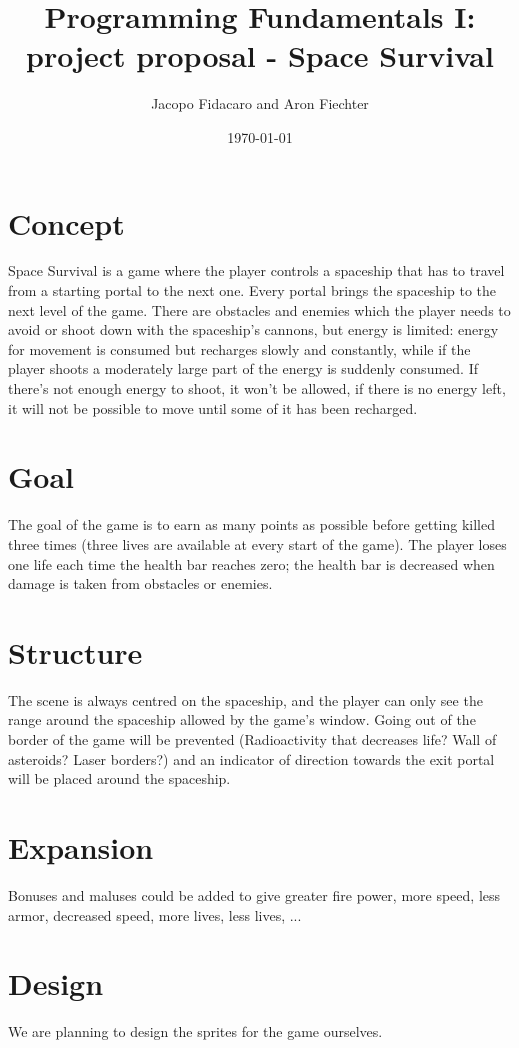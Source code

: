 \documentclass[12pt]{article}
\title{Programming Fundamentals I: project proposal - Space Survival}
\author{Jacopo Fidacaro and Aron Fiechter}
\date{\today}
\begin{document}
\maketitle
\section*{Concept}
Space Survival is a game where the player controls a spaceship that has to travel from a starting portal to the next one. Every portal brings the spaceship to the next level of the game. There are obstacles and enemies which the player needs to avoid or shoot down with the spaceship's cannons, but energy is limited: energy for movement is consumed but recharges slowly and constantly, while if the player shoots a moderately large part of the energy is suddenly consumed. If there's not enough energy to shoot, it won't be allowed, if there is no energy left, it will not be possible to move until some of it has been recharged.
\section*{Goal}
The goal of the game is to earn as many points as possible before getting killed three times (three lives are available at every start of the game). The player loses one life each time the health bar reaches zero; the health bar is decreased when damage is taken from obstacles or enemies.
\section*{Structure}
The scene is always centred on the spaceship, and the player can only see the range around the spaceship allowed by the game's window. Going out of the border of the game will be prevented (Radioactivity that decreases life? Wall of asteroids? Laser borders?) and an indicator of direction towards the exit portal will be placed around the spaceship.
\section*{Expansion}
Bonuses and maluses could be added to give greater fire power, more speed, less armor, decreased speed, more lives, less lives, ...
\section*{Design}
We are planning to design the sprites for the game ourselves.
\end{document}
